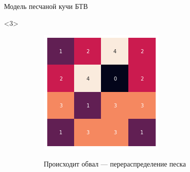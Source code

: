 \documentclass{beamer}
\begin{document}
\begin{frame}{Модель песчаной кучи БТВ}
		\begin{onlyenv}<3>
			\begin{figure}[ht]
				\centering
				\begin{subfigure}{0.45\textwidth}
					\includegraphics[width=\linewidth]{slides/btw_2}
				\end{subfigure}
				\begin{subfigure}{0.45\textwidth}
					Происходит обвал --- перераспределение песка
				\end{subfigure}
			\end{figure}
		\end{onlyenv}
	

\end{frame}
\end{document}
